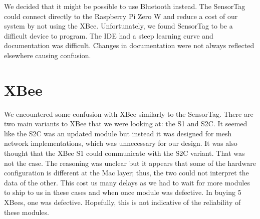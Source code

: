 We decided that it might be possible to use Bluetooth instead. The SensorTag could connect directly to the Raspberry Pi Zero W and reduce a cost of our system by not using the XBee. Unfortunately, we found SensorTag to be a difficult device to program. The IDE had a steep learning curve and documentation was difficult. Changes in documentation were not always reflected elsewhere causing confusion.

\section{XBee}
We encountered some confusion with XBee similarly to the SensorTag. There are two main variants to XBee that we were looking at: the S1 and S2C. It seemed like the S2C was an updated module but instead it was designed for mesh network implementations, which was unnecessary for our design. It was also thought that the XBee S1 could communicate with the S2C variant. That was not the case. The reasoning was unclear but it appears that some of the hardware configuration is different at the Mac layer; thus, the two could not interpret the data of the other. This cost us many delays as we had to wait for more modules to ship to us in these cases and when once module was defective. In buying 5 XBees, one was defective. Hopefully, this is not indicative of the reliability of these modules.